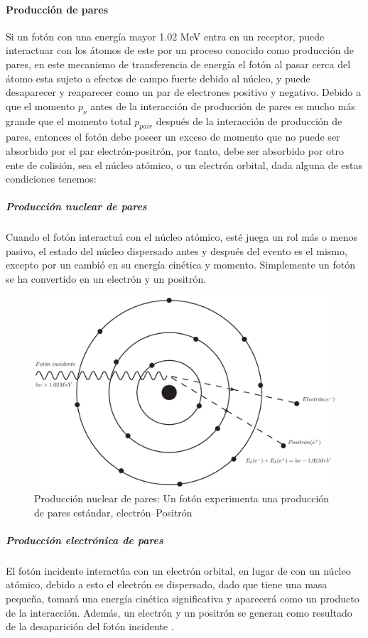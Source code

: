 \paragraph{Producción de pares}
Si un fotón con una energía mayor  1.02 MeV entra en un receptor, puede interactuar con los átomos de este por un proceso conocido como producción de pares, en este mecanismo de transferencia de energía el fotón al pasar cerca del átomo esta sujeto a efectos de campo fuerte debido al núcleo, y puede desaparecer y reaparecer como un par de electrones positivo y negativo.\cite{Edward}
Debido a que el momento $p_\nu$ antes de la interacción de producción de pares es mucho más grande que el momento total  $p_{pair}$ después de la interacción de producción de pares,  entonces el fotón debe poseer un exceso de momento que no puede ser absorbido por el par electrón-positrón, por tanto, debe ser absorbido por otro ente de colisión, sea el núcleo atómico, o un electrón orbital\cite{Podgorsak}, dada alguna de estas condiciones tenemos:
\subparagraph{Producción nuclear de pares}
 Cuando el fotón interactuá con el núcleo atómico, esté juega un rol más o menos pasivo, el estado del núcleo dispersado antes y después del evento es el mismo, excepto por un cambió en su energía cinética y momento. Simplemente un fotón se ha convertido en un electrón y un positrón\cite{Edward}.
\begin{figure}[htbp]
    \centering
    \includegraphics[width=.71\linewidth]{./Figures/nuclearpp.eps}
    \caption[Producción nuclear de pares]{Producción nuclear de pares: Un fotón experimenta una producción de pares estándar, electrón--Positrón}
    \label{fig:PN}
\end{figure}
\subparagraph{Producción electrónica de pares}
 El fotón incidente interactúa con un electrón orbital, en lugar de con un núcleo atómico, debido a esto el electrón es dispersado, dado que tiene una masa pequeña, tomará una energía cinética significativa y aparecerá como un producto de la interacción. Además, un electrón y un positrón se generan como resultado de la desaparición del fotón incidente \cite{Edward}.
